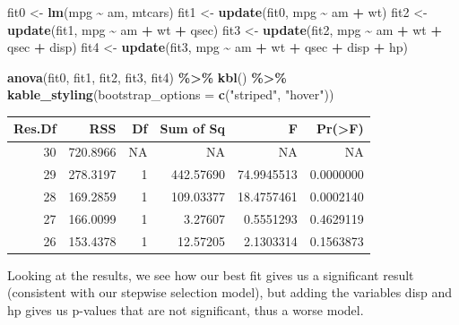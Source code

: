 \documentclass[
]{article}
\newenvironment{Shaded}{\begin{snugshade}}{\end{snugshade}}
\newcommand{\AttributeTok}[1]{\textcolor[rgb]{0.13,0.29,0.53}{#1}}
\newcommand{\FunctionTok}[1]{\textcolor[rgb]{0.13,0.29,0.53}{\textbf{#1}}}
\newcommand{\NormalTok}[1]{#1}
\newcommand{\OtherTok}[1]{\textcolor[rgb]{0.56,0.35,0.01}{#1}}
\newcommand{\SpecialCharTok}[1]{\textcolor[rgb]{0.81,0.36,0.00}{\textbf{#1}}}
\newcommand{\StringTok}[1]{\textcolor[rgb]{0.31,0.60,0.02}{#1}}
\begin{document}
\begin{Shaded}
\begin{Highlighting}[]
\NormalTok{fit0 }\OtherTok{\textless{}{-}} \FunctionTok{lm}\NormalTok{(mpg }\SpecialCharTok{\textasciitilde{}}\NormalTok{ am, mtcars)}
\NormalTok{fit1 }\OtherTok{\textless{}{-}} \FunctionTok{update}\NormalTok{(fit0, mpg }\SpecialCharTok{\textasciitilde{}}\NormalTok{ am }\SpecialCharTok{+}\NormalTok{ wt)}
\NormalTok{fit2 }\OtherTok{\textless{}{-}} \FunctionTok{update}\NormalTok{(fit1, mpg }\SpecialCharTok{\textasciitilde{}}\NormalTok{ am }\SpecialCharTok{+}\NormalTok{ wt }\SpecialCharTok{+}\NormalTok{ qsec)}
\NormalTok{fit3 }\OtherTok{\textless{}{-}} \FunctionTok{update}\NormalTok{(fit2, mpg }\SpecialCharTok{\textasciitilde{}}\NormalTok{ am }\SpecialCharTok{+}\NormalTok{ wt }\SpecialCharTok{+}\NormalTok{ qsec }\SpecialCharTok{+}\NormalTok{ disp)}
\NormalTok{fit4 }\OtherTok{\textless{}{-}} \FunctionTok{update}\NormalTok{(fit3, mpg }\SpecialCharTok{\textasciitilde{}}\NormalTok{ am }\SpecialCharTok{+}\NormalTok{ wt }\SpecialCharTok{+}\NormalTok{ qsec }\SpecialCharTok{+}\NormalTok{ disp }\SpecialCharTok{+}\NormalTok{ hp)}

\FunctionTok{anova}\NormalTok{(fit0, fit1, fit2, fit3, fit4)  }\SpecialCharTok{\%\textgreater{}\%}
  \FunctionTok{kbl}\NormalTok{() }\SpecialCharTok{\%\textgreater{}\%}
  \FunctionTok{kable\_styling}\NormalTok{(}\AttributeTok{bootstrap\_options =} \FunctionTok{c}\NormalTok{(}\StringTok{"striped"}\NormalTok{, }\StringTok{"hover"}\NormalTok{))}
\end{Highlighting}
\end{Shaded}

\begin{table}
\centering
\begin{tabular}[t]{r|r|r|r|r|r}
\hline
Res.Df & RSS & Df & Sum of Sq & F & Pr(>F)\\
\hline
30 & 720.8966 & NA & NA & NA & NA\\
\hline
29 & 278.3197 & 1 & 442.57690 & 74.9945513 & 0.0000000\\
\hline
28 & 169.2859 & 1 & 109.03377 & 18.4757461 & 0.0002140\\
\hline
27 & 166.0099 & 1 & 3.27607 & 0.5551293 & 0.4629119\\
\hline
26 & 153.4378 & 1 & 12.57205 & 2.1303314 & 0.1563873\\
\hline
\end{tabular}
\end{table}

Looking at the results, we see how our best fit gives us a significant
result (consistent with our stepwise selection model), but adding the
variables disp and hp gives us p-values that are not significant, thus a
worse model.
\end{document}
